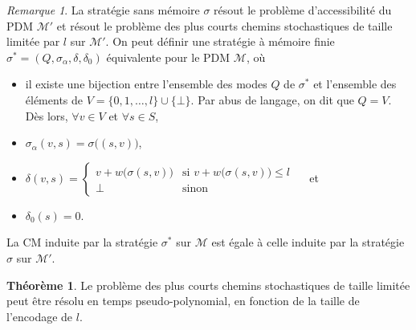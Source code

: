 \documentclass[12pt,a4paper]{report}
\theoremstyle{definition}%
\newtheorem{theorem}{Théorème}[chapter]
\theoremstyle{remark}
\newtheorem{remark}{Remarque}[chapter]
\let\labelitemi\labelitemii
\begin{document}

\begin{remark}
	La stratégie sans mémoire $\sigma$ résout le problème d'accessibilité du PDM
	$\mathcal{M}'$ et résout le problème des plus courts chemins stochastiques de taille limitée par $l$ sur $\mathcal{M}'$. On peut définir une stratégie à mémoire finie $\sigma^* = (Q, \sigma_\alpha, \delta, \delta_0)$ équivalente pour le PDM $\mathcal{M}$, où
	\begin{itemize}
		\renewcommand{\labelitemi}{\tiny$\bullet$}
		\item il existe une bijection entre l'ensemble des modes $Q$ de $\sigma^*$ et l'ensemble des éléments de $V = \{ 0, 1, \dots, l \} \cup \{ \bot \}$. Par abus de langage, on dit que $Q = V$. Dès lors, $\forall v \in V$ et $\forall s \in S$,
		\item $\sigma_\alpha (v, s) = \sigma\big( (s, v) \big)$,
		\item $\delta(v, s) = \begin{cases}
			v + w\big( \sigma(s, v) \big) & \text{si } v + w\big( \sigma(s, v) \big)
				\leq l \\
			\bot & \text{sinon}
		\end{cases} \quad $ et
		\item $\delta_0(s) = 0$.
	\end{itemize}
	La CM induite par la stratégie $\sigma^*$ sur $\mathcal{M}$ est égale à celle
	induite par la stratégie $\sigma$ sur $\mathcal{M}'$.
\end{remark}

\begin{theorem}
	Le problème des plus courts chemins stochastiques de taille limitée peut être
	résolu en temps pseudo-polynomial, en fonction de la taille de l'encodage de
	$l$.
\end{theorem}
\end{document}

